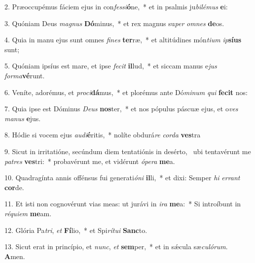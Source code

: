 2. Præoccupémus fáciem ejus in con\textit{fes}\textit{si}\textbf{ó}ne,~*  et in psalmis ju\textit{bi}\textit{lé}\textit{mus} \textbf{e}i:\

3. Quóniam Deus \textit{ma}\textit{gnus} \textbf{Dó}minus,~*  et rex magnus su\textit{per} \textit{om}\textit{nes} \textbf{de}os.\

4. Quia in manu ejus sunt omnes \textit{fi}\textit{nes} \textbf{ter}ræ,~*  et altitúdines món\textit{ti}\textit{um} \textit{ip}\textbf{sí}\textbf{us} sunt;\

5. Quóniam ipsíus est mare, et ipse \textit{fe}\textit{cit} \textbf{il}lud,~*  et siccam manus e\textit{jus} \textit{for}\textit{ma}\textbf{vé}runt.\

6. Veníte, adorémus, et \textit{pro}\textit{ci}\textbf{dá}mus,~*  et plorémus ante Dó\textit{mi}\textit{num} \textit{qui} \textbf{fe}\textbf{cit} nos:\

7. Quia ipse est Dóminus \textit{De}\textit{us} \textbf{nos}ter,~*  et nos pópulus páscuæ ejus, et o\textit{ves} \textit{ma}\textit{nus} \textbf{e}jus.\

8. Hódie si vocem ejus \textit{au}\textit{di}\textbf{é}ritis,~*  nolíte obdurá\textit{re} \textit{cor}\textit{da} \textbf{ves}tra\

9. Sicut in irritatióne, secúndum diem tentatiónis in desérto, \dag\  ubi tentavérunt me \textit{pa}\textit{tres} \textbf{ves}tri:~*  probavérunt me, et vidérunt \textit{ó}\textit{pe}\textit{ra} \textbf{me}a.\

10. Quadragínta annis offénsus fui generati\textit{ó}\textit{ni} \textbf{il}li,~*  et dixi: Semper \textit{hi} \textit{er}\textit{rant} \textbf{cor}de.\

11. Et isti non cognovérunt vias meas: ut jurávi in \textit{i}\textit{ra} \textbf{me}a:~*  Si introíbunt in \textit{ré}\textit{qui}\textit{em} \textbf{me}am.\

12. Glória Pa\textit{tri}, \textit{et} \textbf{Fí}lio,~*  et Spi\textit{rí}\textit{tu}\textit{i} \textbf{Sanc}to.\

13. Sicut erat in princípio, et \textit{nunc}, \textit{et} \textbf{sem}per,~*  et in sǽcula sæ\textit{cu}\textit{ló}\textit{rum}. \textbf{A}men.\

